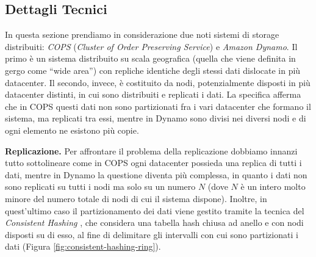 \documentclass[twoside]{article}
\begin{document}
\begin{multicols}{2}
\section{Dettagli Tecnici}
\label{sec:dettagli-tecnici}
In questa sezione prendiamo in considerazione due noti sistemi di storage distribuiti: \emph{COPS} (\emph{Cluster of Order Preserving Service})\cite{bib:COPS} e \emph{Amazon Dynamo}\cite{bib:dynamo}. Il primo è un sistema distribuito su scala geografica (quella che viene definita in gergo come “wide area”) con repliche identiche degli stessi dati dislocate in più datacenter. Il secondo, invece, è costituito da nodi, potenzialmente disposti in più datacenter distinti, in cui sono distribuiti e replicati i dati. La specifica afferma che in COPS questi dati non sono partizionati fra i vari datacenter che formano il sistema, ma replicati tra essi, mentre in Dynamo sono divisi nei diversi nodi e di ogni elemento ne esistono più copie.

\textbf{Replicazione.} Per affrontare il problema della replicazione dobbiamo innanzi tutto sottolineare come in COPS ogni datacenter possieda una replica di tutti i dati, mentre in Dynamo la questione diventa più complessa, in quanto i dati non sono replicati su tutti i nodi ma solo su un numero $N$ (dove $N$ è un intero molto minore del numero totale di nodi di cui il sistema dispone). Inoltre, in quest'ultimo caso il partizionamento dei dati viene gestito tramite la tecnica del \emph{Consistent Hashing} \cite{bib:hashing}, che considera una tabella hash chiusa ad anello e con nodi disposti su di esso, al fine di delimitare gli intervalli con cui sono partizionati i dati (Figura \ref{fig:consistent-hashing-ring}).


\end{multicols}
\end{document}
